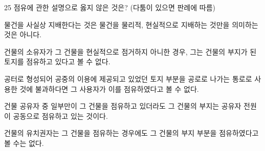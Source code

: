 \begin{question}{25}
점유에 관한 설명으로 옳지 않은 것은? (다툼이 있으면 판례에 따름)
\begin{choices}
  \item 물건을 사실상 지배한다는 것은 물건을 물리적, 현실적으로 지배하는 것만을 의미하는 것은 아니다.
  \item 건물의 소유자가 그 건물을 현실적으로 점거하지 아니한 경우, 그는 건물의 부지가 된 토지를 점유하고 있다고 볼 수 없다.
  \item 공터로 형성되어 공중의 이용에 제공되고 있었던 토지 부분을 공로로 나가는 통로로 사용한 것에 불과하다면 그 사용자가 이를 점유하였다고 볼 수 없다.
  \item 건물 공유자 중 일부만이 그 건물을 점유하고 있더라도 그 건물의 부지는 공유자 전원이 공동으로 점유하고 있는 것이다.
  \item 건물의 유치권자는 그 건물을 점유하는 경우에도 그 건물의 부지 부분을 점유하였다고 볼 수는 없다.
\end{choices}
\end{question}
